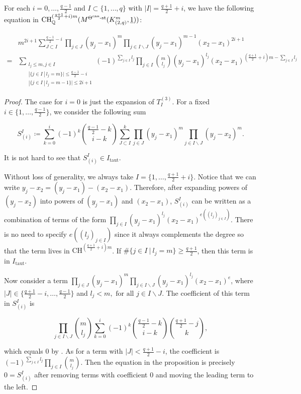 \documentclass[11pt]{article}
\begin{document}
\begin{proposition}\label{Proposition:k2qm-chow-eqs}
    For each \(i = 0, \dots, \frac{q-1}{2}\) and \(I\subset\{1, \dots, q\}\) with \(|I| = \frac{q+1}{2} + i\), we have the following equation in \(\mathrm{CH}^{(\frac{q+1}{2}+i)m}_{\mathbb{Q}}(M^{\Theta^{\text{can}}\text{-st}}(K_{(2,q)}^m, \underline{1}))\):

    \begin{align*}
        &m^{2i+1}\sum_{J\subset I}^{\frac{q-1}{2}-i}\prod_{j\in J}(y_j - x_1)^m\prod_{j\in I\backslash J}(y_j - x_1)^{m-1}(x_2 - x_1)^{2i+1} \\ 
        =& \sum_{\substack{l_j\leq m, j\in I\\ |\{j\in I~|~l_j=m\}|\leq \frac{q-1}{2}-i\\ |\{j\in I~|~l_j=m-1\}|\leq 2i+1}}(-1)^{\sum_{j\in I}l_j}\prod_{j\in I}\binom{m}{l_j}(y_j - x_1)^{l_j}(x_2 - x_1)^{(\frac{q+1}{2}+i)m-\sum_{j\in I}l_j}
    \end{align*}
\end{proposition}

\begin{proof}
    The case for \(i=0\) is just the expansion of \(T_I^{(3)}\). For a fixed \(i\in \{1, \dots, \frac{q-1}{2}\}\), we consider the following sum 

    \[
    S_{(i)}^I\coloneqq \sum_{k = 0}^i(-1)^k\binom{\frac{q-1}{2}-k}{i-k}\sum_{J\subset I}^k\prod_{j\in J}(y_j - x_1)^m\prod_{j\in I\backslash J}(y_j - x_2)^m.
    \]

    It is not hard to see that \(S_{(i)}^I\in I_{\text{taut}}\). 

    Without loss of generality, we always take \(I = \{1, \dots, \frac{q+1}{2} + i\}\). Notice that we can write \(y_j - x_2 = (y_j - x_1) - (x_2 - x_1)\). Therefore, after expanding powers of \((y_j - x_2)\) into powers of \((y_j - x_1)\) and \((x_2 - x_1)\), \(S_{(i)}^I\) can be written as a combination of terms of the form \(\prod_{j\in I}(y_j - x_1)^{l_j}(x_2 - x_1)^{e((l_j)_{j\in I})}\). There is no need to specify \(e((l_j)_{j\in I})\) since it always complements the degree so that the term lives in \(\mathrm{CH}^{(\frac{q+1}{2}+i)m}\). If \(\#\{j\in I~|~l_j=m\}\geq \frac{q+1}{2}\), then this term is in \(I_{\text{taut}}\). 
    
    Now consider a term \(\prod_{j\in J}(y_j - x_1)^m\prod_{j\in I\backslash J}(y_j - x_1)^{l_j}(x_2 - x_1)^e\), where \(|J|\in \{\frac{q+1}{2}-i, \dots, \frac{q-1}{2}\}\) and \(l_j < m, \text{ for all } j\in I\backslash J\). The coefficient of this term in \(S_{(i)}^I\) is 

    \[
    \prod_{j\in I\backslash J}\binom{m}{l_j}\sum_{k = 0}^i(-1)^k\binom{\frac{q-1}{2}-k}{i-k}\binom{\frac{q+1}{2}-j}{k}, 
    \]

    which equals 0 by . As for a term with \(|J| < \frac{q+1}{2} - i\), the coefficient is \((-1)^{\sum_{j\in I}l_j}\prod_{j\in I}\binom{m}{l_j}\). Then the equation in the proposition is precisely \(0 = S_{(i)}^I\) after removing terms with coefficient 0 and moving the leading term to the left. 
\end{proof}
\end{document}

